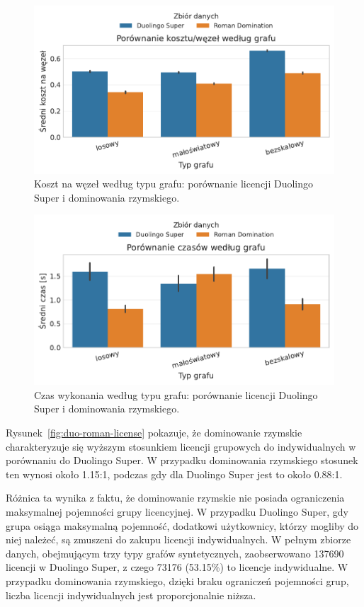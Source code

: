 \begin{figure}[H]
  \centering
  \includegraphics[width=0.6\linewidth]{assets/figures/benchmark/real/duo_vs_roman_cost_per_node_by_graph.pdf}
  \caption{Koszt na węzeł według typu grafu: porównanie licencji Duolingo Super i dominowania rzymskiego.}
  \label{fig:duo-roman-cost}
\end{figure}

\begin{figure}[H]
  \centering
  \includegraphics[width=0.6\linewidth]{assets/figures/benchmark/real/duo_vs_roman_time_by_graph.pdf}
  \caption{Czas wykonania według typu grafu: porównanie licencji Duolingo Super i dominowania rzymskiego.}
  \label{fig:duo-roman-time}
\end{figure}

Rysunek~\ref{fig:duo-roman-license} pokazuje, że dominowanie rzymskie charakteryzuje się wyższym stosunkiem licencji grupowych do indywidualnych w porównaniu do Duolingo Super. W przypadku dominowania rzymskiego stosunek ten wynosi około 1.15:1, podczas gdy dla Duolingo Super jest to około 0.88:1.

Różnica ta wynika z faktu, że dominowanie rzymskie nie posiada ograniczenia maksymalnej pojemności grupy licencyjnej. W przypadku Duolingo Super, gdy grupa osiąga maksymalną pojemność, dodatkowi użytkownicy, którzy mogliby do niej należeć, są zmuszeni do zakupu licencji indywidualnych. W pełnym zbiorze danych, obejmującym trzy typy grafów syntetycznych, zaobserwowano 137690 licencji w Duolingo Super, z czego 73176 (53.15\%) to licencje indywidualne. W przypadku dominowania rzymskiego, dzięki braku ograniczeń pojemności grup, liczba licencji indywidualnych jest proporcjonalnie niższa.

